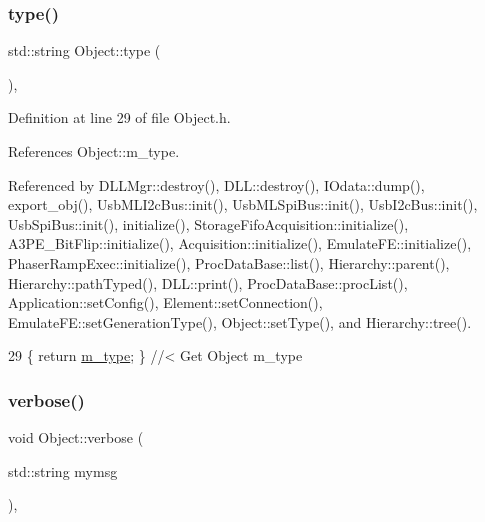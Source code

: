 \subsubsection{\texorpdfstring{type()}{type()}}
{\footnotesize\ttfamily std\+::string Object\+::type (\begin{DoxyParamCaption}{ }\end{DoxyParamCaption})\hspace{0.3cm}{\ttfamily [inline]}, {\ttfamily [inherited]}}



Definition at line 29 of file Object.\+h.



References Object\+::m\+\_\+type.



Referenced by D\+L\+L\+Mgr\+::destroy(), D\+L\+L\+::destroy(), I\+Odata\+::dump(), export\+\_\+obj(), Usb\+M\+L\+I2c\+Bus\+::init(), Usb\+M\+L\+Spi\+Bus\+::init(), Usb\+I2c\+Bus\+::init(), Usb\+Spi\+Bus\+::init(), initialize(), Storage\+Fifo\+Acquisition\+::initialize(), A3\+P\+E\+\_\+\+Bit\+Flip\+::initialize(), Acquisition\+::initialize(), Emulate\+F\+E\+::initialize(), Phaser\+Ramp\+Exec\+::initialize(), Proc\+Data\+Base\+::list(), Hierarchy\+::parent(), Hierarchy\+::path\+Typed(), D\+L\+L\+::print(), Proc\+Data\+Base\+::proc\+List(), Application\+::set\+Config(), Element\+::set\+Connection(), Emulate\+F\+E\+::set\+Generation\+Type(), Object\+::set\+Type(), and Hierarchy\+::tree().


\begin{DoxyCode}
29 \{ \textcolor{keywordflow}{return} \hyperlink{classObject_a457a600fe8c00eb1034374f75110a78c}{m\_type};       \} \textcolor{comment}{//< Get Object m\_type}
\end{DoxyCode}
\mbox{\label{classObject_a83d2db2df682907ea1115ad721c1c4a1}} 
\subsubsection{\texorpdfstring{verbose()}{verbose()}\hspace{0.1cm}{\footnotesize\ttfamily [1/2]}}
{\footnotesize\ttfamily void Object\+::verbose (\begin{DoxyParamCaption}\item[{std\+::string}]{mymsg }\end{DoxyParamCaption})\hspace{0.3cm}{\ttfamily [inline]}, {\ttfamily [inherited]}}




